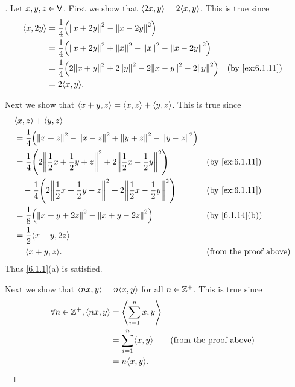 \begin{proof}[]
	Let \(x, y, z \in \mathsf{V}\).
	First we show that \(\inn{2x, y} = 2 \inn{x, y}\).
	This is true since
	\begin{align*}
		\inn{x, 2y} & = \frac{1}{4} \pa{\norm{x + 2y}^2 - \norm{x - 2y}^2}                                                     \\
		            & = \frac{1}{4} \pa{\norm{x + 2y}^2 + \norm{x}^2 - \norm{x}^2 - \norm{x - 2y}^2}                           \\
		            & = \frac{1}{4} \pa{2 \norm{x + y}^2 + 2 \norm{y}^2 - 2 \norm{x - y}^2 - 2 \norm{y}^2} &  & \by{ex:6.1.11} \\
		            & = 2 \inn{x, y}.
	\end{align*}

	Next we show that \(\left\langle x + y, z\right\rangle = \left\langle x, z\right\rangle + \left\langle y, z\right\rangle\).
	This is true since
	\begin{align*}
		 & \inn{x, z} + \inn{y, z}                                                                                                                             \\
		 & = \frac{1}{4} \pa{\norm{x + z}^2 - \norm{x - z}^2 + \norm{y + z}^2 - \norm{y - z}^2}                                                                \\
		 & = \frac{1}{4} \pa{2 \norm{\frac{1}{2} x + \frac{1}{2} y + z}^2 + 2 \norm{\frac{1}{2} x - \frac{1}{2} y}^2}       &  & \by{ex:6.1.11}                \\
		 & \quad - \frac{1}{4} \pa{2 \norm{\frac{1}{2} x + \frac{1}{2} y - z}^2 + 2 \norm{\frac{1}{2} x - \frac{1}{2} y}^2} &  & \by{ex:6.1.11}                \\
		 & = \frac{1}{8} \pa{\norm{x + y + 2z}^2 - \norm{x + y - 2z}^2}                                                     &  & \by{6.1.14}[b]                \\
		 & = \frac{1}{2} \inn{x + y, 2z}                                                                                                                       \\
		 & = \inn{x + y, z}.                                                                                                &  & \text{(from the proof above)}
	\end{align*}
	Thus \cref{6.1.1}(a) is satisfied.

	Next we show that \(\inn{nx, y} = n \inn{x, y}\) for all \(n \in \mathbb{Z}^+\).
	This is true since
	\begin{align*}
		\forall n \in \Z^+, \inn{nx, y} & = \inn{\sum_{i = 1}^n x, y}                                    \\
		                                & = \sum_{i = 1}^n \inn{x, y} &  & \text{(from the proof above)} \\
		                                & = n \inn{x, y}.
	\end{align*}


\end{proof}
